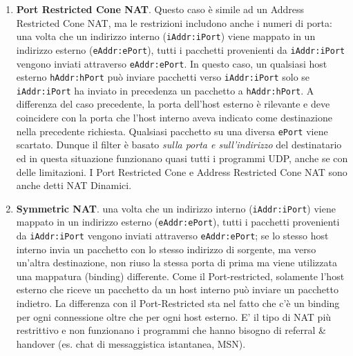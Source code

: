 \begin{enumerate}
	\item \textbf{Port Restricted Cone NAT}. Questo caso è simile ad un Address Restricted Cone NAT, ma le restrizioni includono anche i numeri di porta: una volta che un indirizzo interno (\texttt{iAddr:iPort}) viene mappato in un indirizzo esterno (\texttt{eAddr:ePort}), tutti i pacchetti provenienti da \texttt{iAddr:iPort} vengono inviati attraverso \texttt{eAddr:ePort}. In questo caso, un qualsiasi host esterno \texttt{hAddr:hPort} può inviare pacchetti verso \texttt{iAddr:iPort} solo se \texttt{iAddr:iPort} ha inviato in precedenza un pacchetto a \texttt{hAddr:hPort}. A differenza del caso precedente, la porta dell'host esterno è rilevante e deve coincidere con la porta che l'host interno aveva indicato come destinazione nella precedente richiesta. Qualsiasi pacchetto su una diversa \texttt{ePort} viene scartato. Dunque il filter è basato \textit{sulla porta e sull'indirizzo} del destinatario ed in questa situazione funzionano quasi tutti i programmi UDP, anche se con delle limitazioni. I Port Restricted Cone e Address Restricted Cone NAT sono anche detti NAT Dinamici.
	
	\item \textbf{Symmetric NAT}. una volta che un indirizzo interno (\texttt{iAddr:iPort}) viene mappato in un indirizzo esterno (\texttt{eAddr:ePort}), tutti i pacchetti provenienti da \texttt{iAddr:iPort} vengono inviati attraverso \texttt{eAddr:ePort}; se lo stesso host interno invia un pacchetto con lo stesso indirizzo di sorgente, ma verso un'altra destinazione, non riuso la stessa porta di prima ma viene utilizzata una mappatura (binding) differente. Come il Port-restricted, solamente l'host esterno che riceve un pacchetto da un host interno può inviare un pacchetto indietro. La differenza con il Port-Restricted sta nel fatto che c'è un binding per ogni connessione oltre che per ogni host esterno. E' il tipo di NAT più restrittivo e non funzionano i programmi che hanno bisogno di referral \& handover (es. chat di messaggistica istantanea, MSN).	
\end{enumerate}
